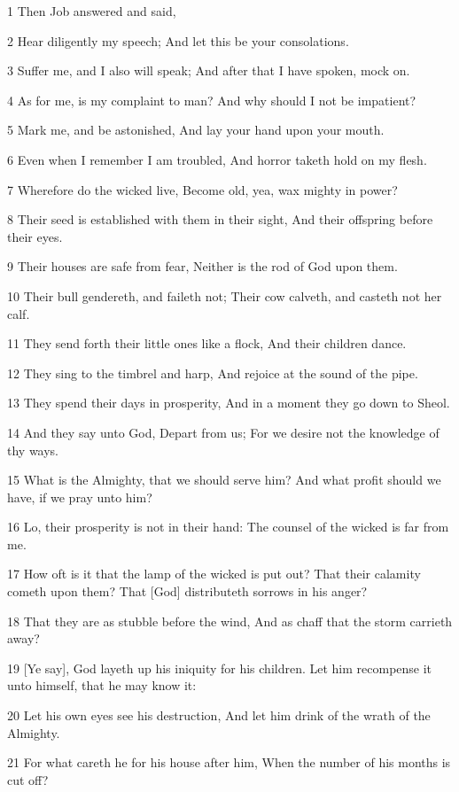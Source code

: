 \par 1 Then Job answered and said,
\par 2 Hear diligently my speech; And let this be your consolations.
\par 3 Suffer me, and I also will speak; And after that I have spoken, mock on.
\par 4 As for me, is my complaint to man? And why should I not be impatient?
\par 5 Mark me, and be astonished, And lay your hand upon your mouth.
\par 6 Even when I remember I am troubled, And horror taketh hold on my flesh.
\par 7 Wherefore do the wicked live, Become old, yea, wax mighty in power?
\par 8 Their seed is established with them in their sight, And their offspring before their eyes.
\par 9 Their houses are safe from fear, Neither is the rod of God upon them.
\par 10 Their bull gendereth, and faileth not; Their cow calveth, and casteth not her calf.
\par 11 They send forth their little ones like a flock, And their children dance.
\par 12 They sing to the timbrel and harp, And rejoice at the sound of the pipe.
\par 13 They spend their days in prosperity, And in a moment they go down to Sheol.
\par 14 And they say unto God, Depart from us; For we desire not the knowledge of thy ways.
\par 15 What is the Almighty, that we should serve him? And what profit should we have, if we pray unto him?
\par 16 Lo, their prosperity is not in their hand: The counsel of the wicked is far from me.
\par 17 How oft is it that the lamp of the wicked is put out? That their calamity cometh upon them? That [God] distributeth sorrows in his anger?
\par 18 That they are as stubble before the wind, And as chaff that the storm carrieth away?
\par 19 [Ye say], God layeth up his iniquity for his children. Let him recompense it unto himself, that he may know it:
\par 20 Let his own eyes see his destruction, And let him drink of the wrath of the Almighty.
\par 21 For what careth he for his house after him, When the number of his months is cut off?
